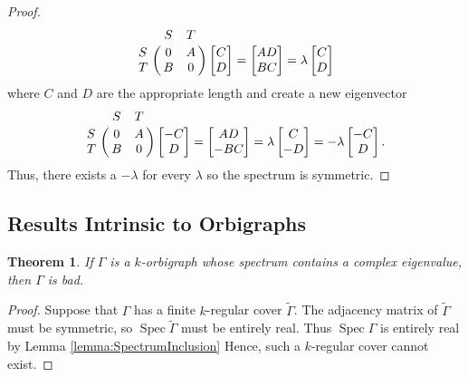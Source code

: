 \documentclass[12pt]{article}
\theoremstyle{plain}
\newtheorem{theorem}{Theorem}
\theoremstyle{definition}
\theoremstyle{remark}
\DeclareMathOperator*{\spec}{Spec}
\begin{document}
\begin{proof}
      $$
      \bordermatrix {
          & S & T  \cr
        S & 0 & A  \cr
        T & B & 0
      }
      \begin{bmatrix}
        C \cr
        D
      \end{bmatrix}
      =
      \begin{bmatrix}
        AD \cr
        BC
      \end{bmatrix}
      =
      \lambda 
      \begin{bmatrix}
        C \cr
        D
      \end{bmatrix}
      $$
      where $C$ and $D$ are the appropriate length and create a new eigenvector
      $$
      \bordermatrix {
          & S & T  \cr
        S & 0 & A  \cr
        T & B & 0
      }
      \begin{bmatrix}
        -C \cr
        D
      \end{bmatrix}
      =
      \begin{bmatrix}
        AD \cr
        -BC
      \end{bmatrix}
      =
      \lambda 
      \begin{bmatrix}
        C \cr
        -D
      \end{bmatrix}
      =
      -\lambda 
      \begin{bmatrix}
        -C \cr
        D
      \end{bmatrix}.
      $$
      Thus, there exists a $-\lambda$ for every $\lambda$ so the spectrum is symmetric.
    \end{proof}


  \subsection{Results Intrinsic to Orbigraphs}

    \begin{theorem}\label{thm:ComplexEigenvalues}
      If $\Gamma$ is a $k$-orbigraph whose spectrum contains a complex eigenvalue, then $\Gamma$ is bad.
    \end{theorem}
    \begin{proof}
      Suppose that $\Gamma$ has a finite $k$-regular cover $\widetilde{\Gamma}$. The adjacency matrix of $\widetilde{\Gamma}$ must be symmetric, so $\spec{\widetilde{\Gamma}}$ must be entirely real. Thus $\spec{\Gamma}$ is entirely real by Lemma \ref{lemma:SpectrumInclusion} Hence, such a $k$-regular cover cannot exist.
    \end{proof}
\end{document}
